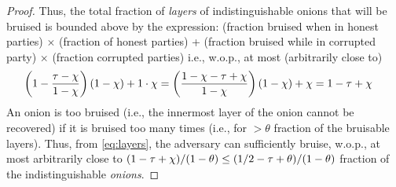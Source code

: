 \documentclass[runningheads,a4paper]{llncs}
\begin{document}
\begin{proof}
Thus, the total fraction of \emph{layers} of indistinguishable onions that will be bruised is bounded above by the expression: %
{(fraction bruised when in honest parties) $\times$ (fraction of honest parties) + (fraction bruised while in corrupted party) $\times$ (fraction corrupted parties)} i.e., w.o.p., at most (arbitrarily close to)
\begin{align}
\left(1 - \frac{\tau-\corruption}{1-\corruption}\right) (1-\corruption) + 1 \cdot \corruption 
&= \left(\frac{1-\corruption - \tau + \corruption}{1-\corruption}\right) (1-\corruption) + \corruption %
= 1 - \tau + \corruption %
\label{eq:layers}
\end{align}
An onion is too bruised (i.e., the innermost layer of the onion cannot be recovered) if it is bruised too many times (i.e., for $>\theta$ fraction of the bruisable layers). %
Thus, 
from \eqref{eq:layers}, 
the adversary can sufficiently bruise, w.o.p., at most arbitrarily close to {$(1-\tau+\chi)/(1-\theta) \le (1/2 - \tau + \theta)/(1-\theta)$} 
fraction of the indistinguishable \emph{onions}. 


\end{proof}
\end{document}
